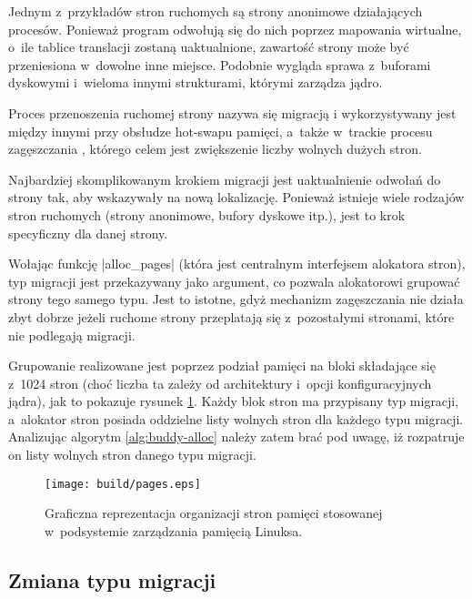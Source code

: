 Jednym z~przykładów stron ruchomych są strony anonimowe działających
procesów.  Ponieważ program odwołują się do nich poprzez mapowania
wirtualne, o~ile tablice translacji zostaną uaktualnione, zawartość
strony może być przeniesiona w~dowolne inne miejsce.  Podobnie wygląda
sprawa z~buforami dyskowymi i~wieloma innymi strukturami, którymi
zarządza jądro.

Proces przenoszenia ruchomej strony nazywa się migracją
i wykorzystywany jest między innymi przy obsłudze hot-swapu pamięci,
a~także w~trackie procesu zagęszczania \autocite{bib:compaction,
  bib:supporting-large-contig-regions}, którego celem jest zwiększenie
liczby wolnych dużych stron.

Najbardziej skomplikowanym krokiem migracji jest uaktualnienie odwołań
do strony tak, aby wskazywały na nową lokalizację.  Ponieważ istnieje
wiele rodzajów stron ruchomych (strony anonimowe, bufory dyskowe
itp.), jest to krok specyficzny dla danej strony.

Wołając funkcję \code|alloc_pages| (która jest centralnym interfejsem
alokatora stron), typ migracji jest przekazywany jako argument, co
pozwala alokatorowi grupować strony tego samego typu.  Jest to
istotne, gdyż mechanizm zagęszczania nie działa zbyt dobrze jeżeli
ruchome strony przeplatają się z~pozostałymi stronami, które nie
podlegają migracji.

Grupowanie realizowane jest poprzez podział pamięci na bloki
składające się z~1024 stron (choć liczba ta zależy od architektury
i~opcji konfiguracyjnych jądra), jak to pokazuje rysunek
\ref{fig:pages}.  Każdy blok stron ma przypisany typ migracji,
a~alokator stron posiada oddzielne listy wolnych stron dla każdego
typu migracji.  Analizując algorytm \ref{alg:buddy-alloc} należy zatem
brać pod uwagę, iż rozpatruje on listy wolnych stron danego typu
migracji.

\begin{figure}[btp]
\begin{center}
\texttt{[image: build/pages.eps]}
\end{center}
\caption[Organizacja pamięci w~Linuksie.]{Graficzna reprezentacja
  organizacji stron pamięci stosowanej w~podsystemie zarządzania
  pamięcią Linuksa.}
\label{fig:pages}
\end{figure}


\subsection{Zmiana typu migracji}\label{sec:type-change}

